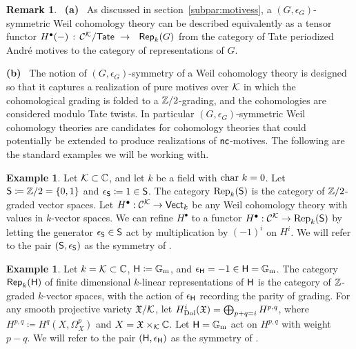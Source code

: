 \documentclass[twoside,leqno]{article}
\numberwithin{equation}{section}
\theoremstyle{plain}
\theoremstyle{definition}
\newtheorem{example}[equation]{Example}
\newtheorem{remark}[equation]{Remark}
\begin{document}
\begin{remark} \label{rem:symmetryG}
\ {\bfseries (a)} \ As discussed in section~\ref{subpar:motivess}, a $(G,\epsilon_{G})$-symmetric Weil cohomology theory can be described equivalently as  a tensor functor $H^{\bullet}(-) \, : \, \mathcal{C}^{\mathcal K}/\mathsf{Tate} \ \to \ \ \mathsf{Rep}_{k}(G)$ from the category of Tate periodized Andr\'{e} motives to the category of representations of $G$.

{\bfseries (b)} \ 
The notion of $(G,\epsilon_{G})$-symmetry of a Weil cohomology theory is designed so that it captures a realization of pure motives over $\mathcal K$ in which the cohomological grading is folded to a $\bbZ/2$-grading, and the cohomologies are considered modulo Tate twists. In particular $(G,\epsilon_{G})$-symmetric Weil cohomology theories are candidates for cohomology theories that could potentially be extended to produce realizations of $\textsf{nc}$-motives. The following are the standard examples we will be working with.
\end{remark}

\begin{example} \label{ex:Z/2graded}
    Let $\mathcal K \subset \mathbb C$, and let $k$ be a field with $\operatorname{char}\, k = 0$. Let 
    $\mathsf{S} \coloneqq \mathbb Z/2 = \{0,1\}$ and $\epsilon_{\mathsf{S}} \coloneqq 1 \in \mathsf{S}$. The category $\operatorname{Rep}_{k}(\mathsf{S})$ is the category of $\bbZ/2$-graded vector spaces. Let $H^{\bullet} : \mathcal{C}^{\mathcal K} \to \mathsf{Vect}_{k}$ be any Weil cohomology theory with values in $k$-vector spaces. We can refine $H^{\bullet}$ to a functor 
    $H^{\bullet} : \mathcal{C}^{\mathcal K} \to  \operatorname{Rep}_{k}(\mathsf{S})$ by letting the generator $\epsilon_{\mathsf{S}} \in \mathsf{S}$ act by multiplication by $(-1)^i$ on $H^{i}$. We will refer to the pair $\left(\mathsf{S},\epsilon_{\mathsf{S}}\right)$ as the symmetry of \strongemph{$\bbZ/2$-graded Weil cohomology theories}.
\end{example}

\begin{example} \label{ex:Hochschildgraded}
    Let $k = \mathcal K \subset \mathbb C$, $\mathsf{H} \coloneqq \mathbb G_\mathrm{m}$, and $\epsilon_{\mathsf{H}} = -1 \in \mathsf{H} = \mathbb G_\mathrm{m}$. The category $\mathsf{Rep}_{k}(\mathsf{H})$ of  finite dimensional $k$-linear representations of $\mathsf{H}$ is the category of $\mathbb Z$-graded $k$-vector spaces, with the action of $\epsilon_{\mathsf{H}}$ recording the parity of grading. 
    For any smooth projective variety $\mathfrak{X}/\mathcal K$, let $H^i_{\operatorname{Dol}}(\mathfrak{X}) = \bigoplus_{p+q=i} H^{p,q}$, where $H^{p,q} \coloneqq H^q(X, \Omega^p_{X})$ and $X = \mathfrak{X} \times_{\mathcal K} \mathbb C$. Let $\mathsf{H} = \mathbb G_\mathrm{m}$ act on $H^{p,q}$ with weight $p-q$. We will refer to the pair $\left(\mathsf{H},\epsilon_{\mathsf{H}}\right)$ as the symmetry of .
\end{example}
\end{document}
